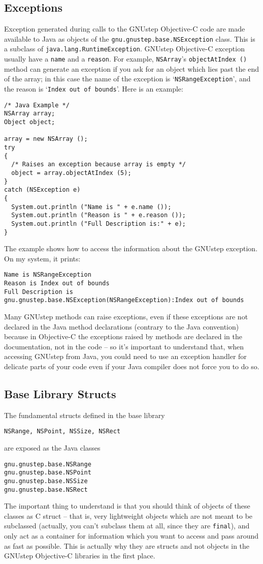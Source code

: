 \subsection{Exceptions}

Exception generated during calls to the GNUstep Objective-C code are
made available to Java as objects of the
\texttt{gnu.gnustep.base.NSException} class.  This is a subclass of
\texttt{java.lang.RuntimeException}.  GNUstep Objective-C exception
usually have a \texttt{name} and a \texttt{reason}.  For example,
\texttt{NSArray}'s \texttt{objectAtIndex ()} method can generate an
exception if you ask for an object which lies past the end of the
array; in this case the name of the exception is
`\texttt{NSRangeException}', and the reason is `\texttt{Index out of
bounds}'.  Here is an example:
\begin{verbatim}
/* Java Example */
NSArray array;
Object object;

array = new NSArray ();
try 
{
  /* Raises an exception because array is empty */
  object = array.objectAtIndex (5);
}
catch (NSException e)
{
  System.out.println ("Name is " + e.name ());
  System.out.println ("Reason is " + e.reason ());
  System.out.println ("Full Description is:" + e);
}
\end{verbatim}
The example shows how to access the information about the GNUstep 
exception.  On my system, it prints:
\begin{verbatim}
Name is NSRangeException
Reason is Index out of bounds
Full Description is gnu.gnustep.base.NSException(NSRangeException):Index out of bounds
\end{verbatim}

Many GNUstep methods can raise exceptions, even if these exceptions
are not declared in the Java method declarations (contrary to the Java
convention) because in Objective-C the exceptions raised by methods
are declared in the documentation, not in the code -- so it's
important to understand that, when accessing GNUstep from Java, you
could need to use an exception handler for delicate parts of your code
even if your Java compiler does not force you to do so.

\subsection{Base Library Structs}
The fundamental structs defined in the base library
\begin{verbatim}
NSRange, NSPoint, NSSize, NSRect
\end{verbatim}
are exposed as the Java classes
\begin{verbatim}
gnu.gnustep.base.NSRange
gnu.gnustep.base.NSPoint
gnu.gnustep.base.NSSize
gnu.gnustep.base.NSRect
\end{verbatim}
The important thing to understand is that you should think of objects
of these classes as C struct -- that is, very lightweight objects
which are not meant to be subclassed (actually, you can't subclass
them at all, since they are \texttt{final}), and only act as a
container for information which you want to access and pass around as
fast as possible.  This is actually why they are structs and not
objects in the GNUstep Objective-C libraries in the first place.


